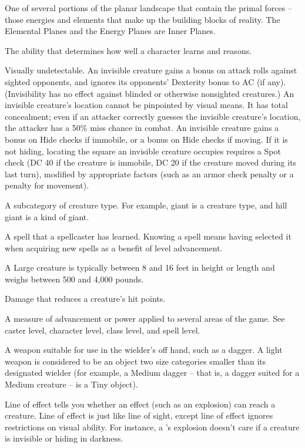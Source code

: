  One of several portions of the planar landscape that 
contain the primal forces -- those energies and elements that make 
up the building blocks of reality. The Elemental Planes and the 
Energy Planes are Inner Planes. 

 The ability that determines how well a 
character learns and reasons. 

 Visually undetectable. An invisible creature gains a  
bonus on attack rolls against sighted opponents, and ignores its 
opponents' Dexterity bonus to AC (if any). (Invisibility has no effect 
against blinded or otherwise nonsighted creatures.) An invisible 
creature's location cannot be pinpointed by visual means. It has total 
concealment; even if an attacker correctly guesses the invisible 
creature's location, the attacker has a 50\% miss chance in combat. 
An invisible creature gains a  bonus on Hide checks if 
immobile, or a  bonus on Hide checks if moving. If it is not hiding, locating the 
square an invisible creature occupies requires a Spot check (DC 40 if 
the creature is immobile, DC 20 if the creature moved during its last 
turn), modified by appropriate factors (such as an armor check 
penalty or a penalty for movement). 

 A subcategory of creature type. For example, giant is a 
creature type, and hill giant is a kind of giant. 

 A spell that a spellcaster has learned. Knowing a spell means having 
selected it when acquiring new spells as a benefit of level advancement. 

 A Large creature is typically between 8 and 16 feet in 
height or length and weighs between 500 and 4,000 pounds. 

 Damage that reduces a creature's hit points. 

 A measure of advancement or power applied to several 
areas of the game. See caster level, character level, class level, and 
spell level. 

 A weapon suitable for use in the wielder's off 
hand, such as a dagger. A light weapon is considered to be an object 
two size categories smaller than its designated wielder (for example, 
a Medium dagger -- that is, a dagger suited for a Medium creature -- is a Tiny object). 

 Line of effect tells you whether an effect (such as 
an explosion) can reach a creature. Line of effect is just like line of 
sight, except line of effect ignores restrictions on visual ability. For 
instance, a 's explosion doesn't care if a creature is invisible or 
hiding in darkness. 

